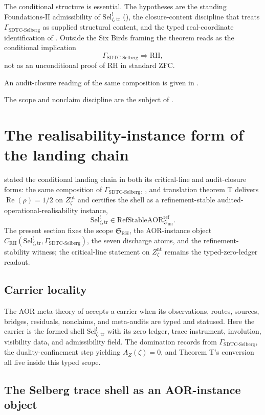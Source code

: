 \documentclass[11pt]{article}
\DeclareMathOperator{\Real}{Re}
\newcommand{\Znt}{Z_{\zeta}^{\mathrm{nt}}}
\newcommand{\AZ}{A_{Z}(\zeta)}
\newcommand{\Sel}{\mathrm{Sel}^{!}_{\zeta,\mathrm{tr}}}
\newcommand{\GamSDTCSelberg}{\Gamma_{\mathrm{SDTC\text{-}Selberg}}}
\theoremstyle{definition}
\begin{document}
The conditional structure is essential.  The hypotheses are the
standing Foundations-II admissibility of \(\Sel\)
(), the closure-content discipline that
treats \(\GamSDTCSelberg\) as supplied structural content, and the
typed real-coordinate identification of
.  Outside the Six Birds framing the
theorem reads as the conditional implication
\[
  \GamSDTCSelberg \Longrightarrow \mathrm{RH},
\]
not as an unconditional proof of RH in standard ZFC.

An audit-closure reading of the same composition is given in
.

The scope and nonclaim discipline are the subject of .
 

\section{The realisability-instance form of the landing chain}
\label{sec:rh-aor-instance}

 stated the conditional landing chain in
both its critical-line and audit-closure forms: the same composition
of \(\GamSDTCSelberg\), , and
translation theorem T delivers \(\Real(\rho)=1/2\) on \(\Znt\) and
certifies the shell as a refinement-stable
audited-operational-realisability instance,
\[
  \Sel \in \mathrm{RefStableAOR}^{\mathrm{ref}}_{\mathfrak S_{\mathrm{RH}}}.
\]
The present section fixes the scope \(\mathfrak S_{\mathrm{RH}}\), the
AOR-instance object \(C_{\mathrm{RH}}(\Sel,\GamSDTCSelberg)\), the
seven discharge atoms, and the refinement-stability witness; the critical-line
statement on \(\Znt\) remains the typed-zero-ledger readout.

\subsection{Carrier locality}

The AOR meta-theory of \citet{TsiokosAOR2026} accepts a carrier when
its observations, routes, sources, bridges, residuals, nonclaims, and
meta-audits are typed and statused.  Here the carrier is the formed
shell \(\Sel\) with its zero ledger, trace instrument, involution,
visibility data, and admissibility field.  The domination records from
\(\GamSDTCSelberg\), the duality-confinement step yielding \(\AZ=0\),
and Theorem T's conversion all live inside this typed scope.

\subsection{The Selberg trace shell as an AOR-instance object}
\end{document}
